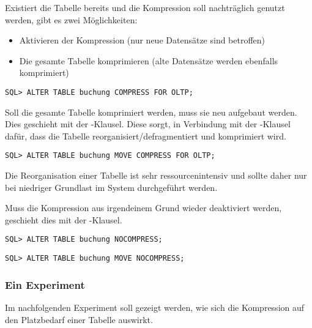           Existiert die Tabelle bereits und die Kompression soll nachträglich genutzt werden, gibt es zwei Möglichkeiten:
          \begin{itemize}
            \item Aktivieren der Kompression (nur neue Datensätze sind betroffen)
            \item Die gesamte Tabelle komprimieren (alte Datensätze werden ebenfalls komprimiert)
          \end{itemize}
          \begin{lstlisting}[caption={Nachträgliches aktivieren der OLTP Kompression},label=admin303,language=oracle_sql]
SQL> ALTER TABLE buchung COMPRESS FOR OLTP;
          \end{lstlisting}
          Soll die gesamte Tabelle komprimiert werden, muss sie neu aufgebaut werden. Dies geschieht mit der -Klausel. Diese sorgt, in Verbindung mit der -Klausel dafür, dass die Tabelle reorganisiert/defragmentiert und komprimiert wird.
          \begin{lstlisting}[caption={Komprimieren einer Tabelle},label=admin304,language=oracle_sql]
SQL> ALTER TABLE buchung MOVE COMPRESS FOR OLTP;
          \end{lstlisting}
          \begin{merke}
            Die Reorganisation einer Tabelle ist sehr ressourcenintensiv und sollte daher nur bei niedriger Grundlast im System durchgeführt werden.
          \end{merke}
          Muss die Kompression aus irgendeinem Grund wieder deaktiviert werden, geschieht dies mit der -Klausel.
          \begin{lstlisting}[caption={Deaktivieren der Kompression},label=admin305,language=oracle_sql]
SQL> ALTER TABLE buchung NOCOMPRESS;
          \end{lstlisting}
          \begin{lstlisting}[caption={Dekomprimieren einer Tabelle},label=admin306,language=oracle_sql]
SQL> ALTER TABLE buchung MOVE NOCOMPRESS;
          \end{lstlisting}
        \subsubsection{Ein Experiment}
          Im nachfolgenden Experiment soll gezeigt werden, wie sich die Kompression auf den Platzbedarf einer Tabelle auswirkt.

